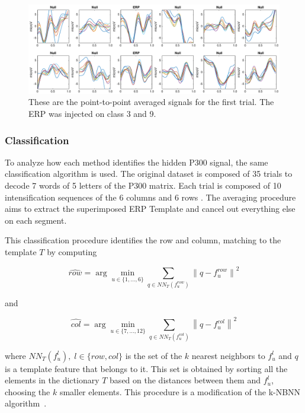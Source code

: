 \documentclass[brainsci,article,submit,moreauthors,pdftex,10pt,a4paper]{mdpi}
\begin{document}
\begin{figure}[H]
\centering
\includegraphics[width=15cm]{images/GainCheck.eps}
\caption{These are the point-to-point averaged signals for the first trial.  The ERP was injected on class 3 and 9.}
\label{fig:gaincheck}
\end{figure}

\subsubsection{Classification} \label{section:classification}

To analyze how each method identifies the hidden P300 signal, the same classification algorithm is used.   The original dataset is composed of 35 trials to decode 7 words of 5 letters  of the P300 matrix.  Each trial is composed of 10 intensification sequences of the 6 columns and 6 rows \citep{Riccio2013}.  The averaging procedure aims to extract the superimposed ERP Template and cancel out everything else on each segment.  

This classification procedure identifies the row and column, matching to the template $T$ by computing  

\begin{equation}
\hat{row} = \arg \min_{u \in \{1,\dots,6\}} \sum_{q \in NN_T(f^{row}_u)}^{} \left\lVert q -  f^{row}_u \right\rVert ^2
\label{eq:multiclassificationrow}
\end{equation}

\noindent and

\begin{equation}
\hat{col} = \arg \min_{u \in \{7,\dots,12\}} \sum_{q \in NN_T(f^{col}_u)}^{} \left\lVert q -  f^{col}_u \right\rVert ^2
\label{eq:multiclassificationcol}
\end{equation}

\noindent where $NN_T(f^l_u),\;l\in\{row,{col}\}$  is the set of the $k$ nearest neighbors to $f^l_u$ and $q$ is a template feature that belongs to it.  This set is obtained by sorting all the elements in the dictionary $T$ based on the distances between them and $f^l_u$, choosing the $k$ smaller elements. This procedure is a modification of the k-NBNN  algorithm~\citep{Boiman2008}.
\end{document}
